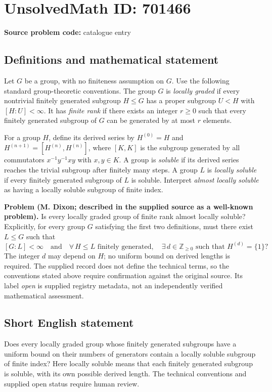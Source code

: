 \documentclass[11pt]{article}
\newcommand{\Z}{\mathbb{Z}}
\begin{document}
\section*{UnsolvedMath ID: 701466}
\textbf{Source problem code:} catalogue entry
\subsection{Definitions and mathematical statement}
Let \(G\) be a group, with no finiteness assumption on \(G\). Use the following standard group-theoretic conventions. The group \(G\) is \emph{locally graded} if every nontrivial finitely generated subgroup \(H\leq G\) has a proper subgroup \(U<H\) with \([H:U]<\infty\). It has \emph{finite rank} if there exists an integer \(r\geq 0\) such that every finitely generated subgroup of \(G\) can be generated by at most \(r\) elements.

For a group \(H\), define its derived series by \(H^{(0)}=H\) and \(H^{(n+1)}=[H^{(n)},H^{(n)}]\), where \([K,K]\) is the subgroup generated by all commutators \(x^{-1}y^{-1}xy\) with \(x,y\in K\). A group is \emph{soluble} if its derived series reaches the trivial subgroup after finitely many steps. A group \(L\) is \emph{locally soluble} if every finitely generated subgroup of \(L\) is soluble. Interpret \emph{almost locally soluble} as having a locally soluble subgroup of finite index.

\textbf{Problem (M. Dixon; described in the supplied source as a well-known problem).} Is every locally graded group of finite rank almost locally soluble? Explicitly, for every group \(G\) satisfying the first two definitions, must there exist \(L\leq G\) such that
\[
 [G:L]<\infty
 \quad\text{and}\quad
 \forall\,H\leq L\text{ finitely generated},\quad
 \exists\,d\in\Z_{\geq 0}\text{ such that }H^{(d)}=\{1\}?
\]
The integer \(d\) may depend on \(H\); no uniform bound on derived lengths is required. The supplied record does not define the technical terms, so the conventions stated above require confirmation against the original source. Its label \emph{open} is supplied registry metadata, not an independently verified mathematical assessment.
\subsection{Short English statement}
Does every locally graded group whose finitely generated subgroups have a uniform bound on their numbers of generators contain a locally soluble subgroup of finite index? Here locally soluble means that each finitely generated subgroup is soluble, with its own possible derived length. The technical conventions and supplied open status require human review.
\end{document}
